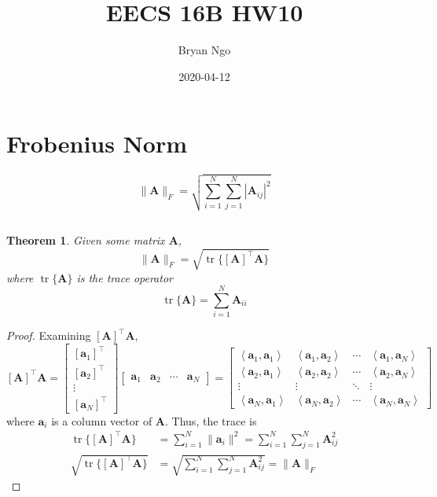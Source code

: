 \documentclass[]{article}
\title{EECS 16B HW10}
\author{Bryan Ngo}
\date{2020-04-12}
\newtheorem{genthm}{Theorem}
\newcommand{\iprod}[2]{\left\langle #1, #2 \right\rangle}
\newcommand{\tpose}[1]{\left[#1\right]^{\! \top} \!\!}
\begin{document}
\maketitle

\section{Frobenius Norm}

\begin{equation}
	\|\bm{A}\|_F = \sqrt{\sum_{i = 1}^N \sum_{j = 1}^N |\bm{A}_{ij}|^2}
\end{equation}

\subsection{}

\begin{genthm}
Given some matrix \(\bm{A}\),
\begin{equation}
	\|\bm{A}\|_F = \sqrt{\operatorname{tr}\{\tpose{\bm{A}} \bm{A}\}}
\end{equation}
where \(\operatorname{tr}\{\bm{A}\}\) is the trace operator
\begin{equation}
	\operatorname{tr}\{\bm{A}\} = \sum_{i = 1}^N \bm{A}_{ii}
\end{equation}
\end{genthm}

\begin{proof}
Examining \(\tpose{\bm{A}} \bm{A}\),
\begin{equation}
	\tpose{\bm{A}} \bm{A} =
	\begin{bmatrix}
	\tpose{\bm{a}_1} \\
	\tpose{\bm{a}_2} \\
	\vdots \\
	\tpose{\bm{a}_N}
	\end{bmatrix}
	\begin{bmatrix}
	\bm{a}_1 & \bm{a}_2 & \cdots & \bm{a}_N
	\end{bmatrix} =
	\begin{bmatrix}
	\iprod{\bm{a}_1}{\bm{a}_1} & \iprod{\bm{a}_1}{\bm{a}_2} & \cdots & \iprod{\bm{a}_1}{\bm{a}_N} \\
	\iprod{\bm{a}_2}{\bm{a}_1} & \iprod{\bm{a}_2}{\bm{a}_2} & \cdots & \iprod{\bm{a}_2}{\bm{a}_N} \\
	\vdots & \vdots & \ddots & \vdots \\
	\iprod{\bm{a}_N}{\bm{a}_1} & \iprod{\bm{a}_N}{\bm{a}_2} & \cdots & \iprod{\bm{a}_N}{\bm{a}_N}
	\end{bmatrix}
\end{equation}
where \(\bm{a}_i\) is a column vector of \(\bm{A}\).
Thus, the trace is
\begin{align}
	\operatorname{tr}\{\tpose{\bm{A}} \bm{A}\} &= \sum_{i = 1}^N \|\bm{a}_i\|^2 = \sum_{i = 1}^N \sum_{j = 1}^N \bm{A}_{ij}^2 \\
	\sqrt{\operatorname{tr}\{\tpose{\bm{A}} \bm{A}\}} &= \sqrt{\sum_{i = 1}^N \sum_{j = 1}^N \bm{A}_{ij}^2} = \|\bm{A}\|_F
\end{align}
\end{proof}
\end{document}
